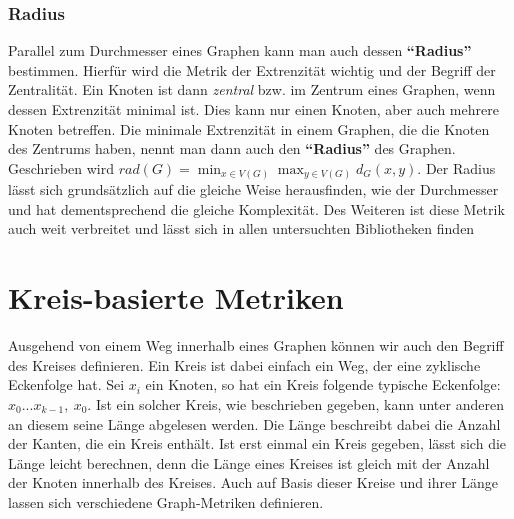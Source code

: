 \documentclass[a4paper,12pt,ngerman,chapterprefix=false,listof=totoc,bibliography=totoc]{scrreprt}
\begin{document}
{\subsubsection*{Radius}
{
Parallel zum Durchmesser eines Graphen kann man auch dessen \textbf{"`Radius"'} bestimmen. Hierfür wird die Metrik der Extrenzität wichtig und der Begriff der Zentralität. Ein Knoten ist dann \textit{zentral} bzw. im Zentrum eines Graphen, wenn dessen Extrenzität minimal ist. Dies kann nur einen Knoten, aber auch mehrere Knoten betreffen. Die minimale Extrenzität in einem Graphen, die die Knoten des Zentrums haben, nennt man dann auch den \textbf{"`Radius"'} des Graphen. Geschrieben wird \(rad(G) = \min_{x\in V(G)}\max_{y\in V(G)}d_G(x,y)\). \cite{diestel_graphentheorie_2000} Der Radius lässt sich grundsätzlich auf die gleiche Weise herausfinden, wie der Durchmesser und hat dementsprechend die gleiche Komplexität. Des Weiteren ist diese Metrik auch weit verbreitet und lässt sich in allen untersuchten Bibliotheken finden \cite{sagemath_graph_2020,wolfram_graph_2020,matlab_shortest_2020}
}
}
\section{Kreis-basierte Metriken}
{
Ausgehend von einem Weg innerhalb eines Graphen können wir auch den Begriff des Kreises definieren. Ein Kreis ist dabei einfach ein Weg, der eine zyklische Eckenfolge hat. Sei \(x_i\) ein Knoten, so hat ein Kreis folgende typische Eckenfolge: \(x_0...x_{k-1},\ x_0\). Ist ein solcher Kreis, wie beschrieben gegeben, kann unter anderen an diesem seine Länge abgelesen werden. Die Länge beschreibt dabei die Anzahl der Kanten, die ein Kreis enthält. Ist erst einmal ein Kreis gegeben, lässt sich die Länge leicht berechnen, denn die Länge eines Kreises ist gleich mit der Anzahl der Knoten innerhalb des Kreises. \cite{diestel_graphentheorie_2000} Auch auf Basis dieser Kreise und ihrer Länge lassen sich verschiedene Graph-Metriken definieren.
}
\end{document}
